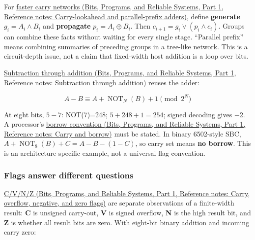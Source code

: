 For \href{../01-Bits-Programs-and-Reliable-Systems-P01/main.pdf\#nameddest=appendix-b5c46b2d94ff}{faster carry networks (Bits, Programs, and Reliable Systems, Part 1, Reference notes: Carry-lookahead and parallel-prefix adders)}, define \textbf{generate} \(g_i=A_i\land B_i\) and \textbf{propagate} \(p_i=A_i\oplus B_i\). Then \(c_{i+1}=g_i\lor(p_i\land c_i)\). Groups can combine these facts without waiting for every single stage. ``Parallel prefix'' means combining summaries of preceding groups in a tree-like network. This is a circuit-depth issue, not a claim that fixed-width host addition is a loop over bits.

\href{../01-Bits-Programs-and-Reliable-Systems-P01/main.pdf\#nameddest=appendix-1c7df340573e}{Subtraction through addition (Bits, Programs, and Reliable Systems, Part 1, Reference notes: Subtraction through addition)} reuses the adder:

\[
A-B \equiv A+\operatorname{NOT}_N(B)+1\pmod{2^N}
\]

At eight bits, \(5-7\): NOT(7)=248; \(5+248+1=254\); signed decoding gives −2. A processor's \href{../01-Bits-Programs-and-Reliable-Systems-P01/main.pdf\#nameddest=appendix-d52d5f78ffd1}{borrow convention (Bits, Programs, and Reliable Systems, Part 1, Reference notes: Carry and borrow)} must be stated. In binary 6502-style SBC, \(A+\operatorname{NOT}_8(B)+C=A-B-(1-C)\), so carry set means \textbf{no borrow}. This is an architecture-specific example, not a universal flag convention.

\subsubsection{Flags answer different questions}\label{05-engine-i-ch001-flags-answer-different-questions}

\hypertarget{05-engine-i-ch001-flags-answer-different-questions}{}

\href{../01-Bits-Programs-and-Reliable-Systems-P01/main.pdf\#nameddest=appendix-8d687c9c08ab}{C/V/N/Z (Bits, Programs, and Reliable Systems, Part 1, Reference notes: Carry, overflow, negative, and zero flags)} are separate observations of a finite-width result: \textbf{C} is unsigned carry-out, \textbf{V} is signed overflow, \textbf{N} is the high result bit, and \textbf{Z} is whether all result bits are zero. With eight-bit binary addition and incoming carry zero:

